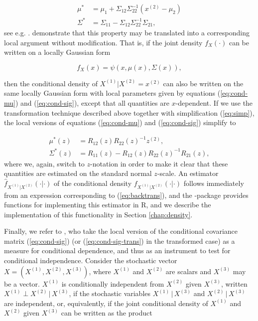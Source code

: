 \begin{align}
\mu^* &= \mu_1 + \Sigma_{12}\Sigma_{22}^{-1}\left(x^{(2)} - \mu_2\right) \label{eq:cond-mu} \\
\Sigma^* &= \Sigma_{11} - \Sigma_{12}\Sigma_{22}^{-1}\Sigma_{21}, \label{eq:cond-sig}
\end{align}
see e.g. \citet[chapter 4]{john:wich:2007}. \citet{otne:tjos:2018} demonstrate that this property may be translated into a corresponding local argument without modification. That is, if the joint density $f_X(\cdot)$ can be written on a locally Gaussian form 

$$f_X(x) = \psi(x, \mu(x), \Sigma(x)),$$

then the conditional density of $X^{(1)}|X^{(2)} = x^{(2)}$ can also be written on the same locally Gaussian form with local parameters given by equations (\ref{eq:cond-mu}) and (\ref{eq:cond-sig}), except that all quantities are $x$-dependent. If we use the transformation technique described above together with simplification (\ref{eq:simp}), the local versions of equations (\ref{eq:cond-mu}) and (\ref{eq:cond-sig}) simplify to

\begin{align}
\mu^*(z) &= R_{12}(z)R_{22}(z)^{-1}z^{(2)},  \label{eq:cond-mu-trans}\\
\Sigma^*(z) &= R_{11}(z) - R_{12}(z)R_{22}(z)^{-1}R_{21}(z), \label{eq:cond-sig-trans}
\end{align}
where we, again, switch to $z$-notation in order to make it clear that these quantities are estimated on the standard normal $z$-scale. An estimator $\widehat f_{X^{(1)}|X^{(2)}}(\cdot|\cdot)$ of the conditional density $f_{X^{(1)}|X^{(2)}}(\cdot|\cdot)$ follows immediately from an expression corresponding to (\ref{eq:backtrans}), and the -package provides functions for implementing this estimator in R, and we describe the implementation of this functionality in Section \ref{chap:density}.

Finally, we refer to \citet{otne:tjos:2019}, who take the local version of the conditional covariance matrix (\ref{eq:cond-sig}) (or (\ref{eq:cond-sig-trans}) in the transformed case) as a measure for conditional dependence, and thus as an instrument to test for conditional independence. Consider the stochastic vector $X = \left(X^{(1)}, X^{(2)}, X^{(3)}\right)$, where $X^{(1)}$ and $X^{(2)}$ are scalars and $X^{(3)}$ may be a vector. $X^{(1)}$ is conditionally independent from $X^{(2)}$ given $X^{(3)}$, written $X^{(1)} \perp X^{(2)} \,|\,X^{(3)}$, if the stochastic variables $X^{(1)}\,|\,X^{(3)}$ and $X^{(2)}\,|\,X^{(3)}$ are independent, or, equivalently, if the joint conditional density of $X^{(1)}$ and $X^{(2)}$ given $X^{(3)}$ can be written as the product


